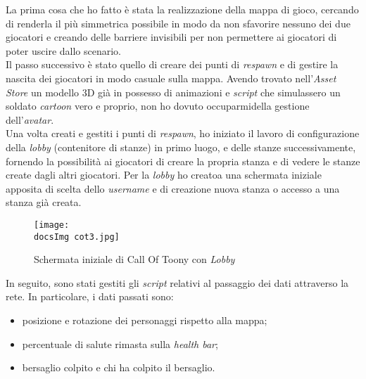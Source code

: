 La prima cosa che ho fatto \`e stata la realizzazione della mappa di gioco, cercando di renderla il pi\`u simmetrica possibile in modo da non sfavorire nessuno dei due giocatori e creando delle barriere invisibili per non permettere ai giocatori di poter uscire dallo scenario.\\
Il passo successivo \`e stato quello di creare dei punti di \textit{respawn} e di gestire la nascita dei giocatori in modo casuale sulla mappa. Avendo trovato nell'\textit{Asset Store} un modello 3D gi\`a in possesso di animazioni e \textit{script} che simulassero un soldato \textit{cartoon} vero e proprio, non ho dovuto occuparmidella gestione dell'\textit{avatar\gloss}.\\
Una volta creati e gestiti i punti di \textit{respawn}, ho iniziato il lavoro di configurazione della \textit{lobby} (contenitore di stanze) in primo luogo, e delle stanze successivamente, fornendo la possibilit\`a ai giocatori di creare la propria stanza e di vedere le stanze create dagli altri giocatori. Per la \textit{lobby} ho creatoa una schermata iniziale apposita di scelta dello \textit{username} e di creazione nuova stanza o accesso a una stanza gi\`a creata.

\begin{figure}[H]
	\centering
	\texttt{[image: \\docsImg cot3.jpg]}
	\caption{Schermata iniziale di Call Of Toony con \textit{Lobby}}
	\label{fig:Schermata iniziale di Call Of Toony con Lobby}
\end{figure}

In seguito, sono stati gestiti gli \textit{script} relativi al passaggio dei dati attraverso la rete. In particolare, i dati passati sono:

\begin{itemize}
	\item posizione e rotazione dei personaggi rispetto alla mappa;
	\item percentuale di salute rimasta sulla \textit{health bar};
	\item bersaglio colpito e chi ha colpito il bersaglio.
\end{itemize}

